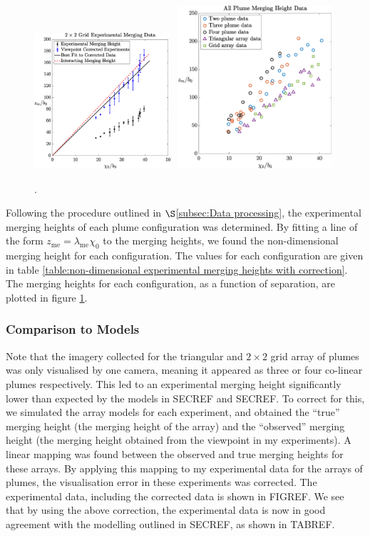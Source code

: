 \documentclass{jfm}
\begin{document}
\begin{figure}
			\includegraphics[width=0.45\textwidth]{gridDataWithViewCorrectionAndErrorBars.eps}\hfill
			\includegraphics[width = 2.375in, height = 2.375in]{allDataCorrected.eps}
			\caption{.}
			\label{fig:experimental data}
	\end{figure}
	\noindent Following the procedure outlined in $\S$\ref{subsec:Data processing}, the experimental merging heights of each plume configuration was determined. By fitting a line of the form $z_{\text{me}} = \lambda_{\text{me}} \chi_0$ to the merging heights, we found the non-dimensional merging height for each configuration. The values for each configuration are given in table \ref{table:non-dimensional experimental merging heights with correction}. The merging heights for each configuration, as a function of separation, are plotted in figure \ref{fig:experimental data}.
	
	\subsubsection{Comparison to Models}
	Note that the imagery collected for the triangular and $2 \times 2$ grid array of plumes was only visualised by one camera, meaning it appeared as three or four co-linear plumes respectively. This led to an experimental merging height significantly lower than expected by the models in SECREF and SECREF. To correct for this, we simulated the array models for each experiment, and obtained the ``true'' merging height (the merging height of the array) and the ``observed'' merging height (the merging height obtained from the viewpoint in my experiments). A linear mapping was found between the observed and true merging heights for these arrays. By applying this mapping to my experimental data for the arrays of plumes, the visualisation error in these experiments was corrected. The experimental data, including the corrected data is shown in FIGREF. We see that by using the above correction, the experimental data is now in good agreement with the modelling outlined in SECREF, as shown in TABREF.
	
\end{document}

